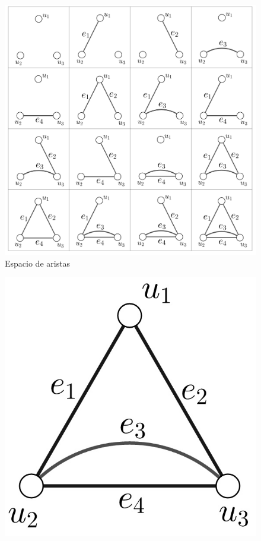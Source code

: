 \begin{ejem}
 \begin{figure}[H]
    \centering
    \includegraphics[scale=0.7]{img/imgchapter3/espacioaristas.jpg}
    \caption{Espacio de aristas}
    \label{fig:edgespace}
\end{figure}
 
 \begin{figure}[H]
    \centering
    \includegraphics[scale=0.3]{img/imgchapter3/grafoejemplo.jpg}
    \caption{}
    \label{fig:grafoejemplo}
\end{figure}


\end{ejem}
